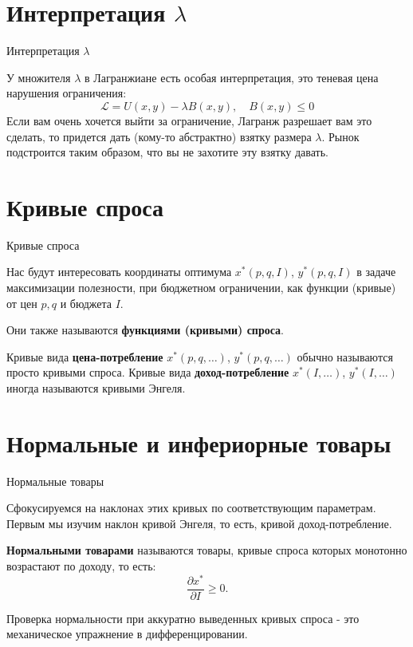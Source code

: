 \documentclass{beamer}
\begin{document}
\section{Интерпретация $\lambda$}

\begin{frame}{Интерпретация $\lambda$}

У множителя $\lambda$ в Лагранжиане есть особая интерпретация, это теневая цена нарушения ограничения:
$$\mathcal{L} = U(x,y) - \lambda B(x,y), \quad B(x,y) \leqslant 0$$ 
Если вам очень хочется выйти за ограничение, Лагранж разрешает вам это сделать, то придется дать (кому-то абстрактно) взятку размера $\lambda$. Рынок подстроится таким образом, что вы не захотите эту взятку давать. 

\end{frame}

\section{Кривые спроса}

\begin{frame}{Кривые спроса}

Нас будут интересовать координаты оптимума $x^{\ast}(p,q,I)$, $y^{\ast}(p,q,I)$ в задаче максимизации полезности, при бюджетном ограничении, как функции (кривые) от цен $p,q$ и бюджета $I$. 

Они также называются \textbf{функциями (кривыми) спроса}.

\begin{definition}
Кривые вида \textbf{цена-потребление} $x^{\ast}(p,q, \ldots)$, $y^{\ast}(p,q, \ldots)$ обычно называются просто кривыми спроса. Кривые вида \textbf{доход-потребление} $x^{\ast}(I, \ldots)$, $y^{\ast}(I, \ldots)$ иногда называются кривыми Энгеля.
\end{definition}

\end{frame}

\section{Нормальные и инфериорные товары}

\begin{frame}{Нормальные товары}

Сфокусируемся на наклонах этих кривых по соответствующим параметрам. Первым мы изучим наклон кривой Энгеля, то есть, кривой доход-потребление.

\begin{definition}
\textbf{Нормальными товарами} называются товары, кривые спроса которых монотонно возрастают по доходу, то есть:
$$\frac{\partial x^{\ast}}{\partial I} \geqslant 0.$$
\end{definition}
Проверка нормальности при аккуратно выведенных кривых спроса - это механическое упражнение в дифференцировании.  

\end{frame}
\end{document}
